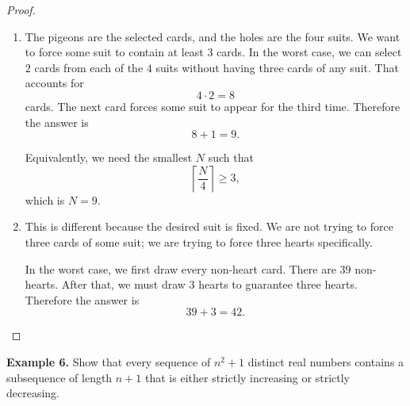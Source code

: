 \documentclass{article}
\begin{document}
\begin{proof}
\begin{enumerate}
    \item The pigeons are the selected cards, and the holes are the four suits. We want to force some suit to contain at least $3$ cards. In the worst case, we can select $2$ cards from each of the $4$ suits without having three cards of any suit. That accounts for
    \[
        4\cdot 2=8
    \]
    cards. The next card forces some suit to appear for the third time. Therefore the answer is
    \[
        8+1=9.
    \]

    Equivalently, we need the smallest $N$ such that
    \[
        \left\lceil \frac{N}{4}\right\rceil \ge 3,
    \]
    which is $N=9$.

    \item This is different because the desired suit is fixed. We are not trying to force three cards of some suit; we are trying to force three hearts specifically.

    In the worst case, we first draw every non-heart card. There are $39$ non-hearts. After that, we must draw $3$ hearts to guarantee three hearts. Therefore the answer is
    \[
        39+3=42.
    \]
\end{enumerate}
\end{proof}
\noindent\textbf{Example 6.} Show that every sequence of $n^2+1$ distinct real numbers contains a subsequence of length $n+1$ that is either strictly increasing or strictly decreasing.
\end{document}
